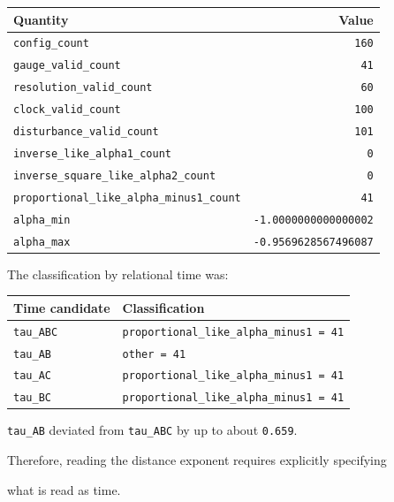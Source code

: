 \documentclass[
]{article}
\newenvironment{Shaded}{}{}
\newcommand{\NormalTok}[1]{#1}
\newcounter{none} %
\begin{document}
{\def\LTcaptype{none} %
\begin{longtable}[]{@{}lr@{}}
\toprule\noalign{}
Quantity & Value \\
\midrule\noalign{}
\endhead
\bottomrule\noalign{}
\endlastfoot
\texttt{config\_count} & \texttt{160} \\
\texttt{gauge\_valid\_count} & \texttt{41} \\
\texttt{resolution\_valid\_count} & \texttt{60} \\
\texttt{clock\_valid\_count} & \texttt{100} \\
\texttt{disturbance\_valid\_count} & \texttt{101} \\
\texttt{inverse\_like\_alpha1\_count} & \texttt{0} \\
\texttt{inverse\_square\_like\_alpha2\_count} & \texttt{0} \\
\texttt{proportional\_like\_alpha\_minus1\_count} & \texttt{41} \\
\texttt{alpha\_min} & \texttt{-1.0000000000000002} \\
\texttt{alpha\_max} & \texttt{-0.9569628567496087} \\
\end{longtable}
}

The classification by relational time was:

{\def\LTcaptype{none} %
\begin{longtable}[]{@{}ll@{}}
\toprule\noalign{}
Time candidate & Classification \\
\midrule\noalign{}
\endhead
\bottomrule\noalign{}
\endlastfoot
\texttt{tau\_ABC} & \texttt{proportional\_like\_alpha\_minus1\ =\ 41} \\
\texttt{tau\_AB} & \texttt{other\ =\ 41} \\
\texttt{tau\_AC} & \texttt{proportional\_like\_alpha\_minus1\ =\ 41} \\
\texttt{tau\_BC} & \texttt{proportional\_like\_alpha\_minus1\ =\ 41} \\
\end{longtable}
}

\texttt{tau\_AB} deviated from \texttt{tau\_ABC} by up to about
\texttt{0.659}.

Therefore, reading the distance exponent requires explicitly specifying

\begin{Shaded}
\begin{Highlighting}[]
\NormalTok{what is read as time.}
\end{Highlighting}
\end{Shaded}
\end{document}
